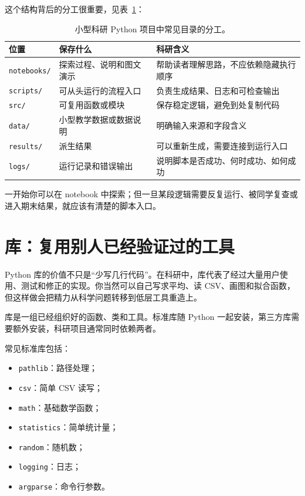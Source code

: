 这个结构背后的分工很重要，见表~\ref{tab:ch04_project_layout}：

\begin{table}[htbp]
\centering
\begin{tabular}{p{}p{}p{}}
\toprule
位置 & 保存什么 & 科研含义 \\
\midrule
\texttt{notebooks/} & 探索过程、说明和图文演示 & 帮助读者理解思路，不应依赖隐藏执行顺序 \\
\texttt{scripts/} & 可从头运行的流程入口 & 负责生成结果、日志和可检查输出 \\
\texttt{src/} & 可复用函数或模块 & 保存稳定逻辑，避免到处复制代码 \\
\texttt{data/} & 小型教学数据或数据说明 & 明确输入来源和字段含义 \\
\texttt{results/} & 派生结果 & 可以重新生成，需要连接到运行入口 \\
\texttt{logs/} & 运行记录和错误输出 & 说明脚本是否成功、何时成功、如何成功 \\
\bottomrule
\end{tabular}
\caption{小型科研 Python 项目中常见目录的分工。}
\label{tab:ch04_project_layout}
\end{table}

一开始你可以在 notebook 中探索；但一旦某段逻辑需要反复运行、被同学复查或进入期末结果，就应该有清楚的脚本入口。

\section{库：复用别人已经验证过的工具}

Python 库的价值不只是“少写几行代码”。在科研中，库代表了经过大量用户使用、测试和修正的实现。你当然可以自己写求平均、读 CSV、画图和拟合函数，但这样做会把精力从科学问题转移到低层工具重造上。

\begin{defbox}[库]
库是一组已经组织好的函数、类和工具。标准库随 Python 一起安装，第三方库需要额外安装，科研项目通常同时依赖两者。
\end{defbox}

常见标准库包括：

\begin{itemize}
    \item \texttt{pathlib}：路径处理；
    \item \texttt{csv}：简单 CSV 读写；
    \item \texttt{math}：基础数学函数；
    \item \texttt{statistics}：简单统计量；
    \item \texttt{random}：随机数；
    \item \texttt{logging}：日志；
    \item \texttt{argparse}：命令行参数。
\end{itemize}

